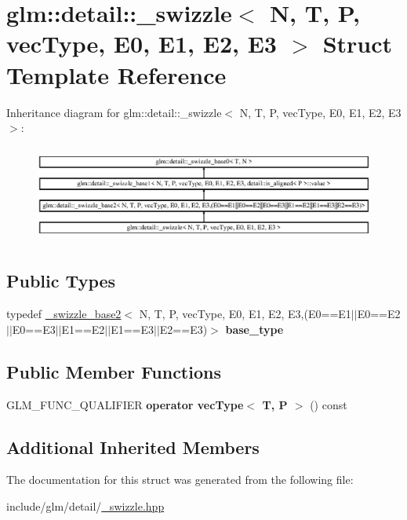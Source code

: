 \hypertarget{structglm_1_1detail_1_1__swizzle}{}\section{glm\+:\+:detail\+:\+:\+\_\+swizzle$<$ N, T, P, vec\+Type, E0, E1, E2, E3 $>$ Struct Template Reference}
\label{structglm_1_1detail_1_1__swizzle}
Inheritance diagram for glm\+:\+:detail\+:\+:\+\_\+swizzle$<$ N, T, P, vec\+Type, E0, E1, E2, E3 $>$\+:\begin{figure}[H]
\begin{center}
\leavevmode
\includegraphics[height=3.246377cm]{structglm_1_1detail_1_1__swizzle}
\end{center}
\end{figure}
\subsection*{Public Types}
\begin{DoxyCompactItemize}
\item 
\mbox{\label{structglm_1_1detail_1_1__swizzle_a38e9744c2fa9929a0c847c52d1832ce6}} 
typedef \hyperlink{structglm_1_1detail_1_1__swizzle__base2}{\+\_\+swizzle\+\_\+base2}$<$ N, T, P, vec\+Type, E0, E1, E2, E3,(E0==E1$\vert$$\vert$E0==E2$\vert$$\vert$E0==E3$\vert$$\vert$E1==E2$\vert$$\vert$E1==E3$\vert$$\vert$E2==E3)$>$ {\bfseries base\+\_\+type}
\end{DoxyCompactItemize}
\subsection*{Public Member Functions}
\begin{DoxyCompactItemize}
\item 
\mbox{\label{structglm_1_1detail_1_1__swizzle_a61812f7b0b36f71a48fb45947a6a94fb}} 
G\+L\+M\+\_\+\+F\+U\+N\+C\+\_\+\+Q\+U\+A\+L\+I\+F\+I\+ER {\bfseries operator vec\+Type$<$ T, P $>$} () const
\end{DoxyCompactItemize}
\subsection*{Additional Inherited Members}


The documentation for this struct was generated from the following file\+:\begin{DoxyCompactItemize}
\item 
include/glm/detail/\hyperlink{__swizzle_8hpp}{\+\_\+swizzle.\+hpp}\end{DoxyCompactItemize}

